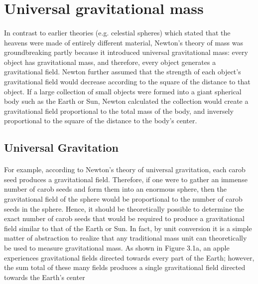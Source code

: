 \documentclass{book}
\begin{document}
\section{Universal gravitational mass}
\begin{multicols}{2}
	\setlength{\columnseprule}{1pt}
	\paragraph{}
	In contrast to earlier theories (e.g. celestial spheres) which stated that the heavens were made of entirely different material, Newton's theory of mass was groundbreaking partly because it introduced universal gravitational mass: every object has gravitational mass, and therefore, every object generates a gravitational field. Newton further assumed that the strength of each object's gravitational field would decrease according to the square of the distance to that object. If a large collection of small objects were formed into a giant spherical body such as the Earth or Sun, Newton calculated the collection would create a gravitational field proportional to the total mass of the body, and inversely proportional to the square of the distance to the body's center.
\end{multicols}

\subsection{Universal Gravitation}
\paragraph{}
For example, according to Newton's theory of universal gravitation, each carob seed produces a gravitational field. Therefore, if one were to gather an immense number of carob seeds and form them into an enormous sphere, then the gravitational field of the sphere would be proportional to the number of carob seeds in the sphere. Hence, it should be theoretically possible to determine the exact number of carob seeds that would be required to produce a gravitational field similar to that of the Earth or Sun. In fact, by unit conversion it is a simple matter of abstraction to realize that any traditional mass unit can theoretically be used to measure gravitational mass. As shown in Figure 3.1a, an apple experiences gravitational fields directed towards every part of the Earth; however, the sum total of these many fields produces a single gravitational field directed towards the Earth's center
\end{document}
